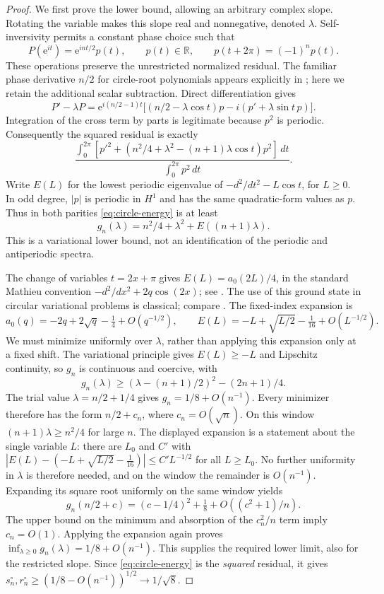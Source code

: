\documentclass[11pt]{article}
\theoremstyle{remark}\newtheorem{remark}[theorem]{Remark}
\newcommand{\ee}{\mathrm e}
\begin{document}
\begin{proof}
We first prove the lower bound, allowing an arbitrary complex slope.
Rotating the variable makes this slope real and nonnegative, denoted
\(\lambda\). Self-inversivity permits a constant phase choice such that
\[
 P(\ee^{it})=\ee^{int/2}p(t),\qquad p(t)\in\mathbb R,
 \qquad p(t+2\pi)=(-1)^n p(t).
\]
These operations preserve the unrestricted normalized residual.
The familiar phase derivative \(n/2\) for circle-root polynomials
appears explicitly in \cite[(1.3)--(1.4)]{erdelyi}; here we retain
the additional scalar subtraction. Direct differentiation gives
\[
 P'-\lambda P=\ee^{i(n/2-1)t}
 \bigl[(n/2-\lambda\cos t)p-i(p'+\lambda\sin t\,p)\bigr].
\]
Integration of the cross term by parts is legitimate because
\(p^2\) is periodic. Consequently the squared residual is exactly
\begin{equation}\label{eq:circle-energy}
 \frac{\int_0^{2\pi}\!
 [p'^2+(n^2/4+\lambda^2-(n+1)\lambda\cos t)p^2]\,dt}
 {\int_0^{2\pi}p^2\,dt}.
\end{equation}
Write \(E(L)\) for the lowest periodic eigenvalue of
\(-d^2/dt^2-L\cos t\), for \(L\ge0\). In odd degree, \(|p|\)
is periodic in \(H^1\) and has the same quadratic-form values as
\(p\). Thus in both parities \eqref{eq:circle-energy} is at least
\[
 g_n(\lambda)=n^2/4+\lambda^2+E((n+1)\lambda).
\]
This is a variational lower bound, not an identification of the
periodic and antiperiodic spectra.

The change of variables \(t=2x+\pi\) gives
\(E(L)=a_0(2L)/4\), in the standard Mathieu convention
\(-d^2/dx^2+2q\cos(2x)\); see \cite[\S28.2]{dlmf}.
The use of this ground state in circular variational problems is
classical; compare \cite[\S VI.A.2]{busch}. The fixed-index expansion
\cite[(28.8.1), \(m=0,s=1\)]{dlmf} is
\[
 a_0(q)=-2q+2\sqrt q-\tfrac14+O(q^{-1/2}),
 \qquad
 E(L)=-L+\sqrt{L/2}-\tfrac1{16}+O(L^{-1/2}).
\]
We must minimize uniformly over \(\lambda\), rather than applying
this expansion only at a fixed shift. The variational principle
gives \(E(L)\ge-L\) and Lipschitz continuity, so \(g_n\) is
continuous and coercive, with
\[
 g_n(\lambda)\ge
 (\lambda-(n+1)/2)^2-(2n+1)/4.
\]
The trial value \(\lambda=n/2+1/4\) gives
\(g_n=1/8+O(n^{-1})\). Every minimizer therefore has the form
\(n/2+c_n\), where \(c_n=O(\sqrt n)\). On this window
\((n+1)\lambda\ge n^2/4\) for large \(n\). The displayed expansion is a
statement about the single variable \(L\): there are \(L_0\) and \(C'\)
with
\(|E(L)-(-L+\sqrt{L/2}-\tfrac1{16})|\le C'L^{-1/2}\) for all \(L\ge L_0\).
No further uniformity in \(\lambda\) is therefore needed, and on the
window the remainder is \(O(n^{-1})\). Expanding its square
root uniformly on the same window yields
\[
 g_n(n/2+c)=(c-1/4)^2+\tfrac18+O((c^2+1)/n).
\]
The upper bound on the minimum and absorption of the \(c_n^2/n\)
term imply \(c_n=O(1)\). Applying the expansion again proves
\(\inf_{\lambda\ge0}g_n(\lambda)=1/8+O(n^{-1})\).
This supplies the required lower limit, also for the restricted slope.
Since \eqref{eq:circle-energy} is the \emph{squared} residual, it gives
\(s_n^\circ,r_n^\circ\ge(1/8-O(n^{-1}))^{1/2}\to1/\sqrt8\).


\end{proof}
\end{document}
